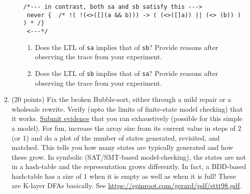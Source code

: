 \documentclass[11pt]{article}
\begin{document}
\begin{enumerate}
\begin{enumerate}


\begin{verbatim}
/*--- in contrast, both sa and sb satisfy this --->
 never {  /* !( !(<>([](a && b))) -> ( (<>([]a)) || (<> (b)) ) ) * /}
 <---*/
\end{verbatim}

    
    \begin{enumerate}
    \item    Does the LTL of {\tt sa} implies that of {\tt sb}?
      Provide reasons after observing the trace from your experiment.


      
    \item    Does the LTL of {\tt sb} implies that of {\tt sa}?
      Provide reasons after observing the trace from your experiment.

   
    \end{enumerate}
  \end{enumerate}




\begin{minipage}{\minpagw}
\end{minipage}

\clearpage


\item (20 points) Fix the broken Bubble-sort, either through
  a mild repair or a wholesale rewrite.
  Verify (upto the limits of finite-state model checking) that
  it works.
  \underline{Submit evidence} that you ran exhaustively (possible for this simple a model).
    For fun, increase the array size from its current value in steps of 2 (or 1) and do a plot
    of the number of states generated, revisited, and matched. This tells you how many
    states are typically generated and how these grow. In symbolic (SAT/SMT-based model-checking),
    the states are not in a hash-table and the representation grows differently. In fact, a
    BDD-based hash-table has a size of $1$ when it is empty as well as when it is full!
    These are K-layer DFAs basically. See \url{https://spinroot.com/gerard/pdf/sttt98.pdf}.
  

\end{enumerate}
\end{document}

